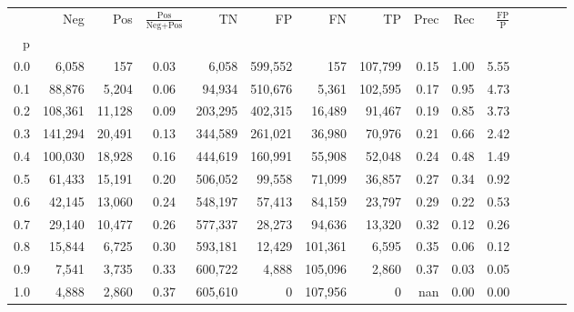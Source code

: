 \begin{tabular}{rrrcrrrrrrrrrrr}
\toprule
{} &      Neg &     Pos & $\frac{\text{Pos}}{\text{Neg}+\text{Pos}}$ &       TN &       FP &       FN &       TP &  Prec &   Rec & $\frac{\text{FP}}{\text{P}}$ \\
p   &          &         &                                            &          &          &          &          &       &       &                              \\
\midrule
0.0 &    6,058 &     157 &                                       0.03 &    6,058 &  599,552 &      157 &  107,799 &  0.15 &  1.00 &                         5.55 \\
0.1 &   88,876 &   5,204 &                                       0.06 &   94,934 &  510,676 &    5,361 &  102,595 &  0.17 &  0.95 &                         4.73 \\
0.2 &  108,361 &  11,128 &                                       0.09 &  203,295 &  402,315 &   16,489 &   91,467 &  0.19 &  0.85 &                         3.73 \\
0.3 &  141,294 &  20,491 &                                       0.13 &  344,589 &  261,021 &   36,980 &   70,976 &  0.21 &  0.66 &                         2.42 \\
0.4 &  100,030 &  18,928 &                                       0.16 &  444,619 &  160,991 &   55,908 &   52,048 &  0.24 &  0.48 &                         1.49 \\
0.5 &   61,433 &  15,191 &                                       0.20 &  506,052 &   99,558 &   71,099 &   36,857 &  0.27 &  0.34 &                         0.92 \\
0.6 &   42,145 &  13,060 &                                       0.24 &  548,197 &   57,413 &   84,159 &   23,797 &  0.29 &  0.22 &                         0.53 \\
0.7 &   29,140 &  10,477 &                                       0.26 &  577,337 &   28,273 &   94,636 &   13,320 &  0.32 &  0.12 &                         0.26 \\
0.8 &   15,844 &   6,725 &                                       0.30 &  593,181 &   12,429 &  101,361 &    6,595 &  0.35 &  0.06 &                         0.12 \\
0.9 &    7,541 &   3,735 &                                       0.33 &  600,722 &    4,888 &  105,096 &    2,860 &  0.37 &  0.03 &                         0.05 \\
1.0 &    4,888 &   2,860 &                                       0.37 &  605,610 &        0 &  107,956 &        0 &   nan &  0.00 &                         0.00 \\
\bottomrule
\end{tabular}
